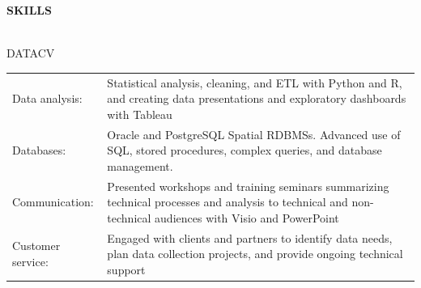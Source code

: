 \documentclass[letterpaper]{article}
\newcommand{\lineunder} {
        \vspace*{-8pt} \\
        \hspace*{-18pt} \hrulefill \\
    }
\newcommand{\header} [1] {
        \vspace{9pt}
        {\hspace*{-18pt}\vspace*{6pt} \large \textbf {#1}}
        \vspace*{-6pt} \lineunder
        \vspace{2pt}
    }
\newenvironment{skillslist}
        {
            \begin{tabular}[t]{ l L{5.17in} }
        }{
            \end{tabular}
        }
\begin{document}
\header{SKILLS}
    \begin{taggedblock}{DATACV}
        \begin{skillslist}
            Data analysis: &
                Statistical analysis, cleaning, and ETL with Python and R,
                and creating data presentations and exploratory dashboards with
                Tableau
                \\
            Databases: &
                Oracle and PostgreSQL Spatial RDBMSs. Advanced use of SQL, stored
                procedures, complex queries, and database management.
                \\
            Communication: &
                Presented workshops and training seminars summarizing technical
                processes and analysis to technical and non-technical audiences
                with Visio and PowerPoint
                \\
            Customer service: &
                Engaged with clients and partners to identify data needs, plan data
                collection projects, and provide ongoing technical support
                \\
        \end{skillslist}
    \end{taggedblock}
\end{document}
